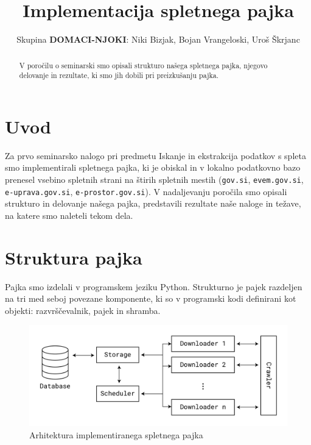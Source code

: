 \documentclass[conference]{IEEEtran}
\begin{document}
	
	\title{Implementacija spletnega pajka}
	
	\author{Skupina \textbf{DOMACI-NJOKI}: Niki Bizjak, Bojan Vrangeloski, Uroš Škrjanc}


	
	\maketitle
	
	\begin{abstract}
		V poročilu o seminarski smo opisali strukturo našega spletnega pajka, njegovo delovanje in rezultate, ki smo jih dobili pri preizkušanju pajka.
	\end{abstract}
	
	\IEEEpeerreviewmaketitle
	
	\section{Uvod}
	
	Za prvo seminarsko nalogo pri predmetu Iskanje in ekstrakcija podatkov s spleta smo implementirali spletnega pajka, ki je obiskal in v lokalno podatkovno bazo prenesel vsebino spletnih strani na štirih spletnih mestih (\texttt{gov.si}, \texttt{evem.gov.si}, \texttt{e-uprava.gov.si}, \texttt{e-prostor.gov.si}). V nadaljevanju poročila smo opisali strukturo in delovanje našega pajka, predstavili rezultate naše naloge in težave, na katere smo naleteli tekom dela.
	
	\section{Struktura pajka}
	
	Pajka smo izdelali v programskem jeziku Python. Strukturno je pajek razdeljen na tri med seboj povezane komponente, ki so v programski kodi definirani kot objekti: razvrščevalnik, pajek in shramba.
	
	
	\begin{figure}[h]
		\centering
		\includegraphics[width=.9\linewidth]{images/arhitecture}
		\caption{Arhitektura implementiranega spletnega pajka}
	\end{figure}
\end{document}
